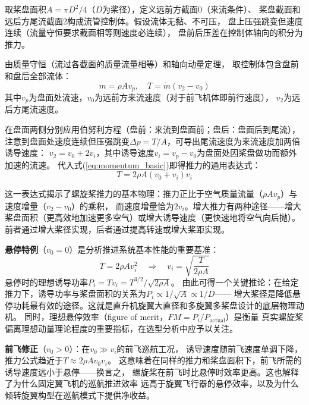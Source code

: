 \documentclass[a4paper,12pt]{ctexart}
\theoremstyle{plain}
\theoremstyle{definition}
\begin{document}
取桨盘面积$A = \pi D^2 / 4$（$D$为桨径），定义远前方截面0（来流条件）、
桨盘截面和远后方尾流截面2构成流管控制体。假设流体无黏、不可压，
盘上压强跳变但速度连续（流量守恒要求截面相等则速度必连续），
盘前后压差在控制体轴向的积分为推力。

由质量守恒（流过各截面的质量流量相等）和轴向动量定理，
取控制体包含盘前和盘后全部流体：
\begin{equation}
    \dot{m} = \rho A v_p, \quad
    T = \dot{m} (v_2 - v_0)
    \label{eq:momentum_basic}
\end{equation}
其中$v_p$为盘面处流速，$v_0$为远前方来流速度（对于前飞机体即前行速度），
$v_2$为远后方尾流速度。

在盘面两侧分别应用伯努利方程（盘前：来流到盘面前；盘后：盘面后到尾流），
注意到盘面处速度连续但压强跳变$\Delta p = T/A$，可导出尾流速度为来流速度加两倍诱导速度：
$v_2 = v_0 + 2v_i$，其中诱导速度$v_i = v_p - v_0$为盘面处因桨盘做功而额外加速的流速。
代入式(\ref{eq:momentum_basic})即得推力的通用表达式：
\begin{equation}
    T = 2\rho A (v_0 + v_i) v_i
    \label{eq:thrust_general}
\end{equation}

这一表达式揭示了螺旋桨推力的基本物理：推力正比于空气质量流量（$\rho A v_p$）与速度增量（$v_2-v_0$）的乘积，
而速度增量恰为$2v_i$。增大推力有两种途径——增大桨盘面积（更高效地加速更多空气）或增大诱导速度（更快速地将空气向后抛）。
前者通过增大桨径实现，后者通过提高转速或增大桨距实现。

\textbf{悬停特例}（$v_0 = 0$）是分析推进系统基本性能的重要基准：
\begin{equation}
    T = 2\rho A v_i^2 \quad\Longrightarrow\quad
    v_i = \sqrt{\frac{T}{2\rho A}}
    \label{eq:hover_induced}
\end{equation}
悬停时的理想诱导功率$P_i = T v_i = T^{3/2} / \sqrt{2\rho A}$。
由此可得一个关键推论：在给定推力下，诱导功率与桨盘面积的关系为$P_i \propto 1/\sqrt{A} \propto 1/D$——
增大桨径是降低悬停功耗最有效的途径。这就是直升机旋翼大直径和多旋翼多桨盘设计的底层物理动机。
同时，理想悬停效率（figure of merit，$FM = P_i / P_{\text{actual}}$）是衡量
真实螺旋桨偏离理想动量理论程度的重要指标，在选型分析中应予以关注。

\textbf{前飞修正}（$v_0 > 0$）：在$v_0 \gg v_i$的前飞巡航工况，
诱导速度随前飞速度单调下降，推力公式趋近于$T \approx 2\rho A v_0 v_i$。
这意味着在同样的推力和桨盘面积下，前飞所需的诱导速度远小于悬停——换言之，
螺旋桨在前飞时比悬停时效率更高。这也解释了为什么固定翼飞机的巡航推进效率
远高于旋翼飞行器的悬停效率，以及为什么倾转旋翼构型在巡航模式下提供净收益。
\end{document}
